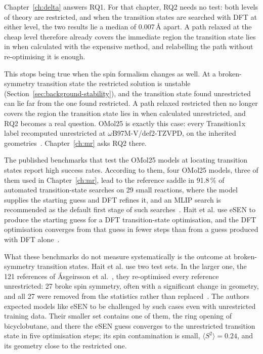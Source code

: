 Chapter~\ref{ch:delta} answers RQ1. For that chapter, RQ2 needs no
test: both levels of theory are restricted, and when the transition
states are searched with DFT at either level, the two results lie
a median of 0.007\,\AA{} apart. A path relaxed at the cheap level
therefore already covers the immediate region the transition state
lies in when calculated with the expensive method, and relabelling the
path without re-optimising it is enough.

This stops being true when the spin formalism changes as well. At a
broken-symmetry transition state the restricted solution is unstable
(Section~\ref{sec:background-stability}), and the transition state
found unrestricted can lie far from the one found restricted. A path
relaxed restricted then no longer covers the region the transition
state lies in when calculated unrestricted, and RQ2 becomes a real
question. OMol25 is exactly this case: every Transition1x label
recomputed unrestricted at \mbox{$\omega$B97M-V/def2-TZVPD}, on the
inherited geometries~\cite{omol25}. Chapter~\ref{ch:mr} asks RQ2 there.

The published benchmarks that test the OMol25 models at locating
transition states report high success rates. According to them, four
OMol25 models, three
of them used in Chapter~\ref{ch:mr}, lead to the reference saddle in 91.8\,\% of
automated transition-state searches on 29 small reactions, where the
model supplies the starting guess and DFT refines it, and an MLIP search
is recommended as the default first stage of such
searches~\cite{marks2026}. Hait et
al. use eSEN to produce the starting guess for a DFT transition-state
optimisation, and the DFT optimisation converges from that guess in
fewer steps than from a guess produced with DFT alone~\cite{hait2025}.

What these benchmarks do not measure systematically is the outcome at
broken-symmetry transition states. Hait et al. use two test sets. In
the larger one, the 121 references of \'Asgeirsson et
al.~\cite{asgeirsson2021}, they re-optimised every reference
unrestricted: 27 broke spin symmetry, often with a significant change
in geometry, and all 27 were removed from the statistics rather than
replaced~\cite{hait2025}. The authors expected models like eSEN to be
challenged by such cases even with unrestricted training data. Their
smaller set contains one of them, the ring opening of bicyclobutane,
and there the eSEN guess converges to the unrestricted transition state
in five optimisation steps; its spin contamination is small,
$\langle S^2\rangle = 0.24$, and its geometry close to the restricted
one.

